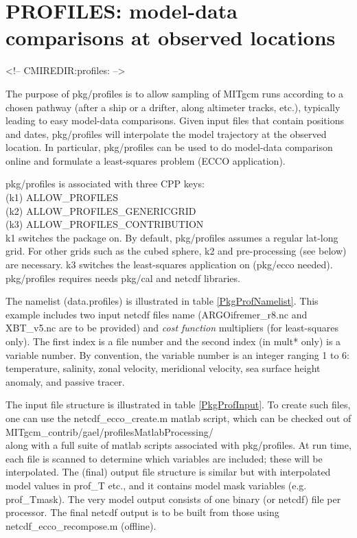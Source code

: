 \section{PROFILES: model-data comparisons at observed locations}
\label{sec:pkg:profiles}
\begin{rawhtml}
<!-- CMIREDIR:profiles: -->
\end{rawhtml}

\bigskip

The purpose of pkg/profiles is to allow sampling of MITgcm runs according to a chosen pathway (after a ship or a drifter, along altimeter tracks, etc.), typically leading to easy model-data comparisons. Given input files that contain positions and dates, pkg/profiles will interpolate the model trajectory at the observed location. In particular, pkg/profiles can be used to do model-data comparison online and formulate a least-squares problem (ECCO application). 

\bigskip

pkg/profiles is associated with three CPP keys: \\ 
 (k1) ALLOW\_PROFILES \\
 (k2) ALLOW\_PROFILES\_GENERICGRID \\
 (k3) ALLOW\_PROFILES\_CONTRIBUTION \\
k1 switches the package on. By default, pkg/profiles assumes a regular lat-long grid. For other grids such as the cubed sphere, k2 and pre-processing (see below) are necessary. k3 switches the least-squares application on (pkg/ecco needed). pkg/profiles requires needs pkg/cal and netcdf libraries. 

\bigskip

The namelist (data.profiles) is illustrated in table \ref{PkgProfNamelist}. This example includes two input netcdf files name (ARGOifremer\_r8.nc and XBT\_v5.nc are to be provided) and {\it cost function} multipliers (for least-squares only). The first index is a file number and the second index (in mult* only) is a variable number. By convention, the variable number is an integer ranging 1 to 6: temperature, salinity, zonal velocity, meridional velocity, sea surface height anomaly, and passive tracer. 

\bigskip

The input file structure is illustrated in table \ref{PkgProfInput}. To create such files, one can use the netcdf\_ecco\_create.m matlab script, which can be checked out of \\ 
MITgcm\_contrib/gael/profilesMatlabProcessing/ \\
along with a full suite of matlab scripts associated with pkg/profiles. At run time, each file is scanned to determine which variables are included; these will be interpolated. The (final) output file structure is similar but with interpolated model values in prof\_T etc., and it contains model mask variables (e.g. prof\_Tmask). The very model output consists of one binary (or netcdf) file per processor. The final netcdf output is to be built from those using netcdf\_ecco\_recompose.m (offline).

